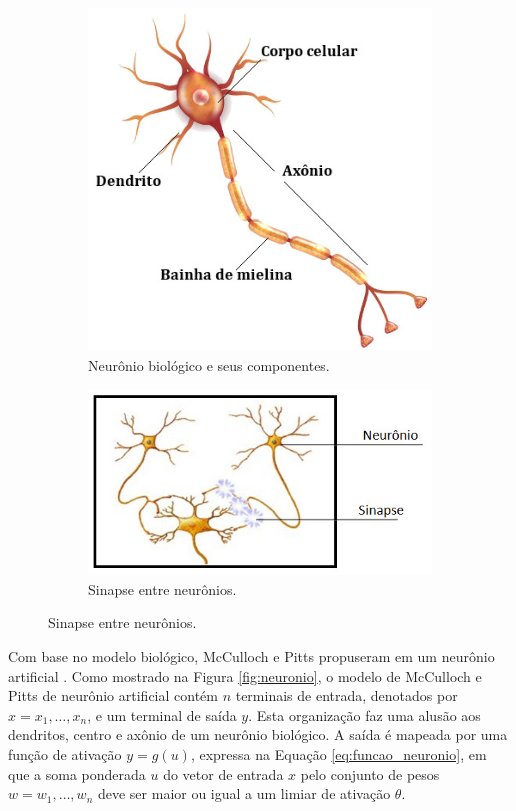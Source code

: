 \begin{figure}
	\caption{Redes neurais biológicas. Fonte: FALTANDO!}
	\begin{subfigure}[h]{0.5\linewidth}
		\caption{Neurônio biológico e seus componentes.}
		\label{fig:neuronio_biologico}
		\includegraphics[width=0.7\linewidth]{img/neuronio}
	\end{subfigure}
	\begin{subfigure}[h]{0.5\linewidth}
		\caption{Sinapse entre neurônios.}
		\label{fig:redeneuralbiologica}
		\includegraphics[width=\linewidth]{./img/redeneuralbiologica.jpg}
	\end{subfigure}%
\end{figure}


Com base no modelo biológico, McCulloch e Pitts propuseram em  um neurônio artificial \cite{mcculloch1943logical}. Como mostrado na Figura \ref{fig:neuronio}, o modelo de McCulloch e Pitts de neurônio artificial contém $n$ terminais de entrada, denotados por $x = x_1, \ldots, x_n$, e um terminal de saída $y$. Esta organização faz uma alusão aos dendritos, centro e axônio de um neurônio biológico. A saída é mapeada por uma função de ativação $y = g(u)$, expressa na Equação \ref{eq:funcao_neuronio}, em que a soma ponderada $u$ do vetor de entrada $x$ pelo conjunto de pesos $w = w_1, \ldots, w_n$ deve ser maior ou igual a um limiar de ativação $\theta$. 


